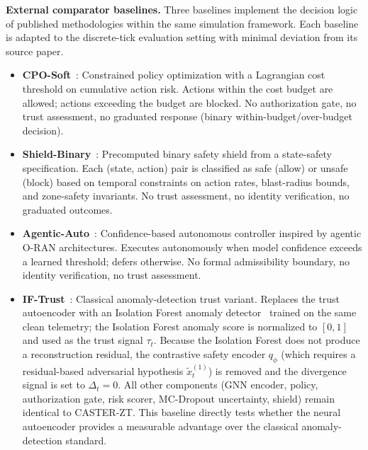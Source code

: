 \documentclass[10pt,journal,compsoc]{IEEEtran}
\begin{document}
\noindent\textbf{External comparator baselines.}
Three baselines implement the decision logic of published methodologies within the same simulation framework.
Each baseline is adapted to the discrete-tick evaluation setting with minimal deviation from its source paper.
\begin{itemize}
    \item \textbf{CPO-Soft}~\cite{achiam2017cpo}: Constrained policy optimization with a Lagrangian cost threshold on cumulative action risk.
    Actions within the cost budget are allowed; actions exceeding the budget are blocked.
    No authorization gate, no trust assessment, no graduated response (binary within-budget/over-budget decision).
    \item \textbf{Shield-Binary}~\cite{alshiekh2018shielding}: Precomputed binary safety shield from a state-safety specification.
    Each (state, action) pair is classified as safe (allow) or unsafe (block) based on temporal constraints on action rates, blast-radius bounds, and zone-safety invariants.
    No trust assessment, no identity verification, no graduated outcomes.
    \item \textbf{Agentic-Auto}~\cite{toward_autonomous_oran_2026}: Confidence-based autonomous controller inspired by agentic O-RAN architectures.
    Executes autonomously when model confidence exceeds a learned threshold; defers otherwise.
    No formal admissibility boundary, no identity verification, no trust assessment.
    \item \textbf{IF-Trust}~\cite{zahoor2025ifocsvm}: Classical anomaly-detection trust variant.
    Replaces the trust autoencoder with an Isolation Forest anomaly detector~\cite{zahoor2025ifocsvm,haque2023dbscanwsn} trained on the same clean telemetry; the Isolation Forest anomaly score is normalized to $[0,1]$ and used as the trust signal $\tau_t$.
    Because the Isolation Forest does not produce a reconstruction residual, the contrastive safety encoder $q_\phi$ (which requires a residual-based adversarial hypothesis $\tilde{x}_t^{(1)}$) is removed and the divergence signal is set to $\Delta_t = 0$.
    All other components (GNN encoder, policy, authorization gate, risk scorer, MC-Dropout uncertainty, shield) remain identical to CASTER-ZT.
    This baseline directly tests whether the neural autoencoder provides a measurable advantage over the classical anomaly-detection standard.
\end{itemize}
\end{document}
